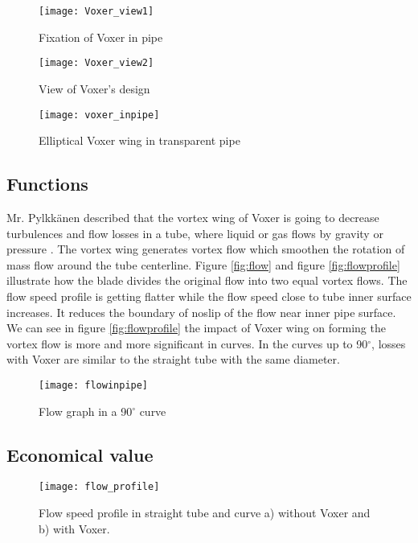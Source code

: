 \begin{figure}[h]
  \centering
  \texttt{[image: Voxer\_view1]}
  \caption{ Fixation of Voxer in pipe \cite{voxer:article}}
  \label{fig:voxer1}
\end{figure}

\begin{figure}[h]
  \centering
  \texttt{[image: Voxer\_view2]}
  \caption{ View of Voxer's design \cite{voxer:article}}
  \label{fig:voxer2}
\end{figure}

\begin{figure}[h]
  \centering
  \texttt{[image: voxer\_inpipe]}
  \caption{ Elliptical Voxer wing in transparent pipe}
  \label{fig:voxerpipe}
\end{figure}

\subsection{Functions}

Mr. Pylkkänen described that the vortex wing of Voxer is going to decrease turbulences and flow losses in a tube, where liquid or gas flows by gravity or pressure \cite{voxer:article}. The vortex wing generates vortex flow which smoothen the rotation of mass flow around the tube centerline. Figure \vref{fig:flow} and figure \vref{fig:flowprofile} illustrate how the blade divides the original flow into two equal vortex flows. The flow speed profile is getting flatter while the flow speed close to tube inner surface increases. It reduces the boundary of \gls{noslip} of the flow near inner pipe surface. We can see in figure \vref{fig:flowprofile} the impact of Voxer wing on forming the vortex flow is more and more significant in curves. In the curves up to 90$^{\circ}$, losses with Voxer are similar to the straight tube with the same diameter. 

\begin{figure}[h]
  \centering
  \texttt{[image: flowinpipe]}
  \caption{ Flow graph in a 90$^{\circ}$ curve\cite{voxer:article}}
  \label{fig:flow}
\end{figure}
\subsection{Economical value}
\begin{figure}[h]
  \centering
  \texttt{[image: flow\_profile]}
  \caption{ Flow speed profile in straight tube and curve \newline a) without Voxer and b) with Voxer. \cite{voxer:article}}
  \label{fig:flowprofile}
\end{figure}

